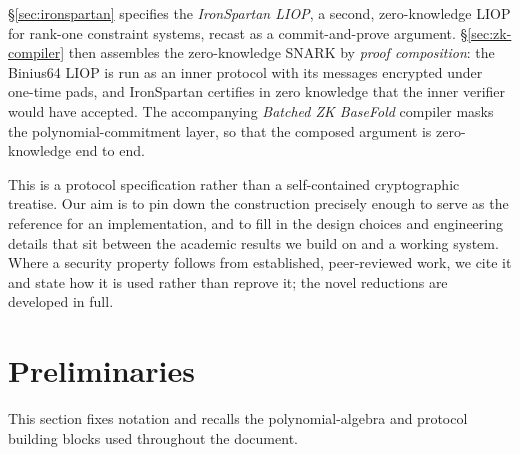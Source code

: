\documentclass{article}
\theoremstyle{definition}
\begin{document}
\S\ref{sec:ironspartan} specifies the \emph{IronSpartan LIOP}, a second, zero-knowledge LIOP for rank-one constraint systems, recast as a commit-and-prove argument. \S\ref{sec:zk-compiler} then assembles the zero-knowledge SNARK by \emph{proof composition}: the Binius64 LIOP is run as an inner protocol with its messages encrypted under one-time pads, and IronSpartan certifies in zero knowledge that the inner verifier would have accepted. The accompanying \emph{Batched ZK BaseFold} compiler masks the polynomial-commitment layer, so that the composed argument is zero-knowledge end to end.

This is a protocol specification rather than a self-contained cryptographic treatise. Our aim is to pin down the construction precisely enough to serve as the reference for an implementation, and to fill in the design choices and engineering details that sit between the academic results we build on and a working system. Where a security property follows from established, peer-reviewed work, we cite it and state how it is used rather than reprove it; the novel reductions are developed in full.

\section{Preliminaries}
\label{sec:preliminaries}
\label{sec:notation}

This section fixes notation and recalls the polynomial-algebra and protocol building blocks used throughout the document.
\end{document}

